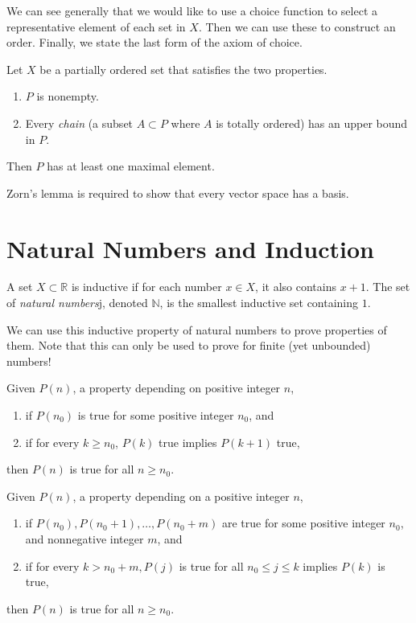 \documentclass{article}
\begin{document}
    We can see generally that we would like to use a choice function to select a representative element of each set in $X$. Then we can use these to construct an order. Finally, we state the last form of the axiom of choice. 

    \begin{axiom}
      Let $X$ be a partially ordered set that satisfies the two properties. 
      \begin{enumerate}
        \item $P$ is nonempty. 
        \item Every \textit{chain} (a subset $A \subset P$ where $A$ is totally ordered) has an upper bound in $P$. 
      \end{enumerate}
      Then $P$ has at least one maximal element. 
    \end{axiom}

    Zorn's lemma is required to show that every vector space has a basis. 

\section{Natural Numbers and Induction}

  \begin{definition}
    A set $X \subset \mathbb{R}$ is inductive if for each number $x \in X$, it also contains $x + 1$. The set of \textit{natural numbers}j, denoted $\mathbb{N}$, is the smallest inductive set containing $1$. 
  \end{definition}

  We can use this inductive property of natural numbers to prove properties of them. Note that this can only be used to prove for finite (yet unbounded) numbers! 

  \begin{lemma}
    Given $P(n)$, a property depending on positive integer $n$, 
    \begin{enumerate}
      \item if $P(n_0)$ is true for some positive integer $n_0$, and
      \item if for every $k \geq n_0$, $P(k)$ true implies $P(k+1)$ true, 
    \end{enumerate}
    then $P(n)$ is true for all $n \geq n_0$. 
  \end{lemma}

  \begin{lemma}
    Given $P(n)$, a property depending on a positive integer $n$, 
    \begin{enumerate}
      \item if $P(n_0), P(n_0 + 1), \ldots, P(n_0 + m)$ are true for some positive integer $n_0$, and nonnegative integer $m$, and 
      \item if for every $k > n_0 + m, P(j)$ is true for all $n_0 \leq j \leq k$ implies $P(k)$ is true, 
    \end{enumerate}
    then $P(n)$ is true for all $n \geq n_0$. 
  \end{lemma}
\end{document}
